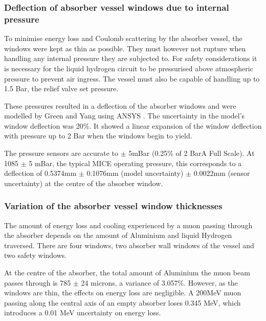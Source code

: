 \subsubsection{Deflection of absorber vessel windows due to internal pressure}
\label{SubSect:Absorber_pressure}

To minimise energy loss and Coulomb scattering by the absorber vessel, the windows were kept as thin as
possible. They must however not rupture when handling any internal pressure they are subjected to. For
safety considerations \cite{1748-0221-13-09-T09008} \cite{Ishimoto} it is necessary for the liquid hydrogen
circuit to be pressurised above atmospheric pressure to prevent air ingress. The vessel must also be
capable of handling up to 1.5 Bar, the relief valve set pressure.

These pressures resulted in a deflection of the absorber windows and were modelled by Green and Yang using
ANSYS \cite{NOTE155}. The uncertainty in the model's window deflection was 20\%. It showed a linear
expansion of the window deflection with pressure up to 2 Bar when the windows begin to yield. 

 The pressure sensors are accurate to $\mathrm{\pm}$ 5mBar (0.25\% of 2 BarA Full Scale). At 1085
 $\mathrm{\pm}$ 5 mBar, the typical MICE operating pressure, this corresponds to a deflection of 0.5374mm
 $\mathrm{\pm}$ 0.1076mm (model uncertainty) $\mathrm{\pm}$ 0.0022mm (sensor uncertainty) at the centre of
 the absorber window.


\subsubsection{Variation of the absorber vessel window thicknesses}
\label{SubSect:Absorber_thickness}

The amount of energy loss and cooling experienced by a muon passing through the absorber depends on the amount of
Aluminium and liquid Hydrogen traversed. There are four windows, two absorber wall windows of the vessel and two safety windows.

At the centre of the absorber, the
total amount of Aluminium the muon beam passes through is 785 $\mathrm{\pm}$ 24 microns, a variance of
3.057\%. However, as the windows are thin, the effects on energy loss are negligible. A 200MeV muon passing
along the central axis of an empty absorber loses 0.345 MeV, which introduces a 0.01 MeV uncertainty on
energy loss.


